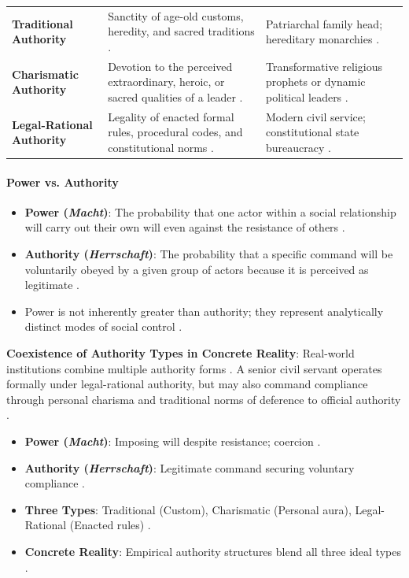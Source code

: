 \begin{table}[htbp]
\centering
\begin{tabularx}{\textwidth}{p{3.8cm} Y Y}
\hline
{}
 &  &  \\
\hline
\textbf{Traditional Authority} & Sanctity of age-old customs, heredity, and sacred traditions . & Patriarchal family head; hereditary monarchies . \\
\textbf{Charismatic Authority} & Devotion to the perceived extraordinary, heroic, or sacred qualities of a leader . & Transformative religious prophets or dynamic political leaders . \\
\textbf{Legal-Rational Authority} & Legality of enacted formal rules, procedural codes, and constitutional norms . & Modern civil service; constitutional state bureaucracy . \\
\hline
\end{tabularx}
\end{table}

\paragraph{Power vs. Authority}
\begin{itemize}
    \item \textbf{Power (\textit{Macht})}: The probability that one actor within a social relationship will carry out their own will even against the resistance of others .
    \item \textbf{Authority (\textit{Herrschaft})}: The probability that a specific command will be voluntarily obeyed by a given group of actors because it is perceived as legitimate .
    \item Power is not inherently greater than authority; they represent analytically distinct modes of social control .
\end{itemize}

\begin{CriticalPoint}
\textbf{Coexistence of Authority Types in Concrete Reality}: Real-world institutions combine multiple authority forms . A senior civil servant operates formally under legal-rational authority, but may also command compliance through personal charisma and traditional norms of deference to official authority .
\end{CriticalPoint}

\begin{QuickRevision}
\begin{itemize}
    \item \textbf{Power (\textit{Macht})}: Imposing will despite resistance; coercion .
    \item \textbf{Authority (\textit{Herrschaft})}: Legitimate command securing voluntary compliance .
    \item \textbf{Three Types}: Traditional (Custom), Charismatic (Personal aura), Legal-Rational (Enacted rules) .
    \item \textbf{Concrete Reality}: Empirical authority structures blend all three ideal types .
\end{itemize}
\end{QuickRevision}

